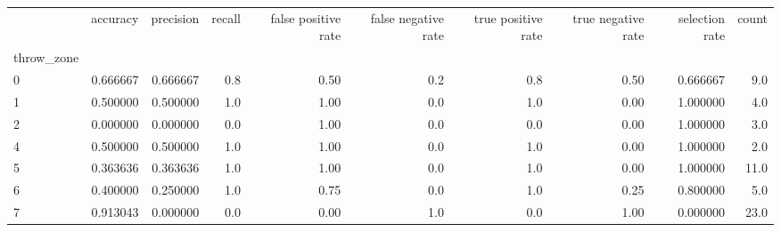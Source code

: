 \begin{tabular}{lrrrrrrrrr}
\toprule
{} &  accuracy &  precision &  recall &  false positive rate &  false negative rate &  true positive rate &  true negative rate &  selection rate &  count \\
throw\_zone &           &            &         &                      &                      &                     &                     &                 &        \\
\midrule
0          &  0.666667 &   0.666667 &     0.8 &                 0.50 &                  0.2 &                 0.8 &                0.50 &        0.666667 &    9.0 \\
1          &  0.500000 &   0.500000 &     1.0 &                 1.00 &                  0.0 &                 1.0 &                0.00 &        1.000000 &    4.0 \\
2          &  0.000000 &   0.000000 &     0.0 &                 1.00 &                  0.0 &                 0.0 &                0.00 &        1.000000 &    3.0 \\
4          &  0.500000 &   0.500000 &     1.0 &                 1.00 &                  0.0 &                 1.0 &                0.00 &        1.000000 &    2.0 \\
5          &  0.363636 &   0.363636 &     1.0 &                 1.00 &                  0.0 &                 1.0 &                0.00 &        1.000000 &   11.0 \\
6          &  0.400000 &   0.250000 &     1.0 &                 0.75 &                  0.0 &                 1.0 &                0.25 &        0.800000 &    5.0 \\
7          &  0.913043 &   0.000000 &     0.0 &                 0.00 &                  1.0 &                 0.0 &                1.00 &        0.000000 &   23.0 \\
\bottomrule
\end{tabular}
